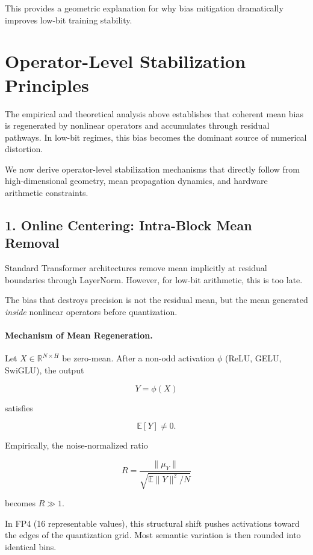 This provides a geometric explanation for why
bias mitigation dramatically improves low-bit training stability.


\section{Operator-Level Stabilization Principles}
\label{sec:operator_stabilization}

The empirical and theoretical analysis above establishes that
coherent mean bias is regenerated by nonlinear operators
and accumulates through residual pathways.
In low-bit regimes, this bias becomes the dominant source of
numerical distortion.

We now derive operator-level stabilization mechanisms
that directly follow from high-dimensional geometry,
mean propagation dynamics, and hardware arithmetic constraints.

\subsection{1. Online Centering: Intra-Block Mean Removal}
\label{subsec:online_centering}

Standard Transformer architectures remove mean implicitly at residual
boundaries through LayerNorm.
However, for low-bit arithmetic, this is too late.

The bias that destroys precision is not the residual mean,
but the mean generated \emph{inside} nonlinear operators
before quantization.

\paragraph{Mechanism of Mean Regeneration.}

Let $X \in \mathbb{R}^{N \times H}$ be zero-mean.
After a non-odd activation $\phi$ (ReLU, GELU, SwiGLU),
the output

\[
Y = \phi(X)
\]

satisfies

\[
\mathbb{E}[Y] \neq 0.
\]

Empirically, the noise-normalized ratio

\[
R = \frac{\|\mu_Y\|}{\sqrt{\mathbb{E}\|Y\|^2/N}}
\]

becomes $R \gg 1$.

In FP4 (16 representable values),
this structural shift pushes activations toward
the edges of the quantization grid.
Most semantic variation is then rounded into identical bins.

